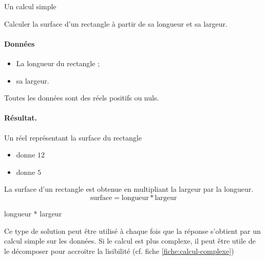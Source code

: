 \begin{Fiche}{Un calcul simple}
\label{fiche:calcul-simple}

	Calculer la surface d'un rectangle 
	à partir de sa longueur et sa largeur.


	\paragraph{Données}
	\begin{itemize}
	\item La longueur du rectangle ;
	\item sa largeur.
	\end{itemize}
	Toutes les données sont des réels positifs ou nuls.

	\paragraph{Résultat.}
	Un réel représentant la surface du rectangle

	\bigskip
	\begin{center}	
	\end{center}


	\begin{itemize}
	\item {} donne $12$
	\item {} donne $5$
	\end{itemize}


	La surface d'un rectangle est obtenue en multipliant
	la largeur par la longueur.
	\begin{equation}
		\textrm{surface} = \textrm{longueur} * \textrm{largeur}
	\end{equation}
	

	\begin{LDA}
		\Return longueur * largeur
	\EndAlgo
	\end{LDA}


	Ce type de solution peut être utilisé à chaque fois
	que la réponse s'obtient par un calcul simple sur les données.
	Si le calcul est plus complexe, 
	il peut être utile de le décomposer pour accroitre la lisibilité
	(cf. fiche \vref{fiche:calcul-complexe}) 
	
\end{Fiche}
